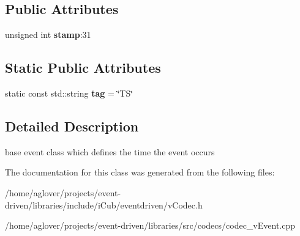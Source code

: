 \subsection*{Public Attributes}
\begin{DoxyCompactItemize}
\item 
unsigned int {\bfseries stamp}\+:31\hypertarget{classev_1_1vEvent_ad4e003653fa59b37682addefce835490}{}\label{classev_1_1vEvent_ad4e003653fa59b37682addefce835490}

\end{DoxyCompactItemize}
\subsection*{Static Public Attributes}
\begin{DoxyCompactItemize}
\item 
static const std\+::string {\bfseries tag} = \char`\"{}TS\char`\"{}\hypertarget{classev_1_1vEvent_a54bcc0830c5993b56f1f47e23df1de8e}{}\label{classev_1_1vEvent_a54bcc0830c5993b56f1f47e23df1de8e}

\end{DoxyCompactItemize}


\subsection{Detailed Description}
base event class which defines the time the event occurs 

The documentation for this class was generated from the following files\+:\begin{DoxyCompactItemize}
\item 
/home/aglover/projects/event-\/driven/libraries/include/i\+Cub/eventdriven/v\+Codec.\+h\item 
/home/aglover/projects/event-\/driven/libraries/src/codecs/codec\+\_\+v\+Event.\+cpp\end{DoxyCompactItemize}

